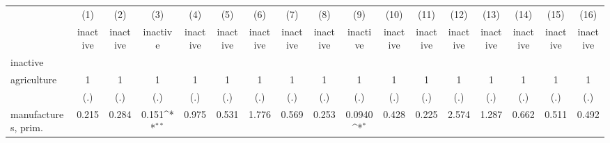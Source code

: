 {
\def\sym#1{\ifmmode^{#1}\else\(^{#1}\)\fi}
\begin{tabular}{l*{16}{c}}
\hline\hline
                    &\multicolumn{1}{c}{(1)}&\multicolumn{1}{c}{(2)}&\multicolumn{1}{c}{(3)}&\multicolumn{1}{c}{(4)}&\multicolumn{1}{c}{(5)}&\multicolumn{1}{c}{(6)}&\multicolumn{1}{c}{(7)}&\multicolumn{1}{c}{(8)}&\multicolumn{1}{c}{(9)}&\multicolumn{1}{c}{(10)}&\multicolumn{1}{c}{(11)}&\multicolumn{1}{c}{(12)}&\multicolumn{1}{c}{(13)}&\multicolumn{1}{c}{(14)}&\multicolumn{1}{c}{(15)}&\multicolumn{1}{c}{(16)}\\
                    &\multicolumn{1}{c}{inactive}&\multicolumn{1}{c}{inactive}&\multicolumn{1}{c}{inactive}&\multicolumn{1}{c}{inactive}&\multicolumn{1}{c}{inactive}&\multicolumn{1}{c}{inactive}&\multicolumn{1}{c}{inactive}&\multicolumn{1}{c}{inactive}&\multicolumn{1}{c}{inactive}&\multicolumn{1}{c}{inactive}&\multicolumn{1}{c}{inactive}&\multicolumn{1}{c}{inactive}&\multicolumn{1}{c}{inactive}&\multicolumn{1}{c}{inactive}&\multicolumn{1}{c}{inactive}&\multicolumn{1}{c}{inactive}\\
\hline
inactive            &                     &                     &                     &                     &                     &                     &                     &                     &                     &                     &                     &                     &                     &                     &                     &                     \\
agriculture         &           1         &           1         &           1         &           1         &           1         &           1         &           1         &           1         &           1         &           1         &           1         &           1         &           1         &           1         &           1         &           1         \\
                    &         (.)         &         (.)         &         (.)         &         (.)         &         (.)         &         (.)         &         (.)         &         (.)         &         (.)         &         (.)         &         (.)         &         (.)         &         (.)         &         (.)         &         (.)         &         (.)         \\
[1em]
manufactures, prim. &       0.215         &       0.284         &       0.151\sym{**} &       0.975         &       0.531         &       1.776         &       0.569         &       0.253         &      0.0940\sym{*}  &       0.428         &       0.225         &       2.574         &       1.287         &       0.662         &       0.511         &       0.492         \\

\end{tabular}}
